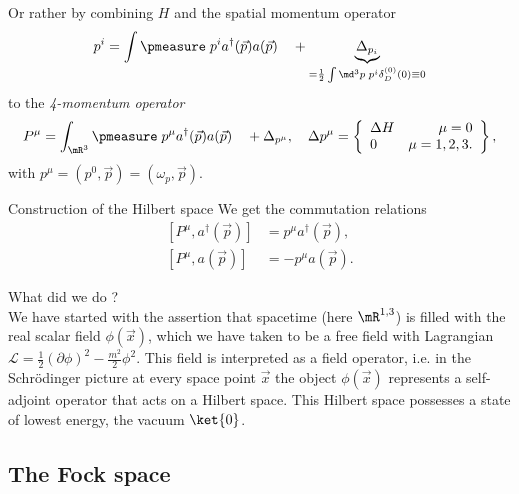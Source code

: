 Or rather by combining $H$ and the spatial momentum operator
\begin{equation}
	p^i = \int \pmeasure \; p^i a^{\dagger} (\vec{p}) a(\vec{p}) \quad + \underbrace{\Delta_{p_i}}_{=\frac{1}{2} \int \md^3 p \; p^i \delta^{(0)}_D(0) \equiv 0 }
\end{equation}
to the \emph{4-momentum operator}
\begin{equation}
	P^{\mu} = \int_{\mR^3} \pmeasure \; p^{\mu} a^{\dagger}(\vec{p}) a(\vec{p}) \quad+ \Delta_{p^{\mu}}, \quad \Delta p^{\mu} = \left\{ \begin{array}{lr}
	\Delta H & \mu =0 \\
	0 & \mu=1,2,3.
	\end{array}\right\},
\end{equation}
with $p^{\mu} =(p^0,\vec{p})= (\omega_p, \vec{p})$.
\begin{mybox}{Construction of the Hilbert space}
	We get the commutation relations
	\begin{align}
		\left[P^{\mu}, a^{\dagger} (\vec{p})\right] & = p^{\mu} a^{\dagger}(\vec{p}), \\
		\left[P^{\mu},a(\vec{p})\right] &= -p^{\mu} a(\vec{p}).
	\end{align}
\end{mybox}
What did we do ?\\
We have started with the assertion that spacetime (here $\mR^{1,3}$) is filled with the real scalar field $\phi(\vec{x})$, which we have taken to be a free field with Lagrangian $\mathcal{L}=\frac{1}{2} (\partial \phi)^2 - \frac{m^2}{2} \phi^2$. This field is interpreted as a field operator, i.e. in the Schrödinger picture at every space point $\vec{x}$ the object $\phi(\vec{x})$ represents a self-adjoint operator that acts on a Hilbert space. This Hilbert space possesses a state of lowest energy, the vacuum $\ket{0}$.


\subsection{The Fock space}


